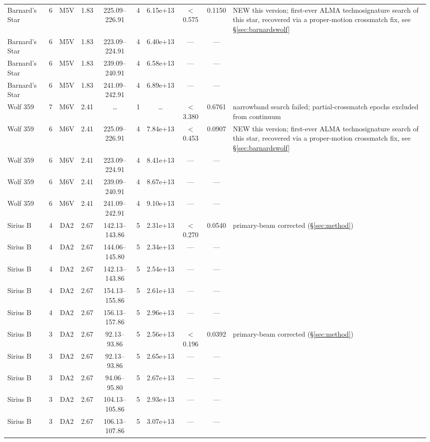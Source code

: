 \documentclass{openjournal}
\begin{document}
\begin{table}
\begin{tabularx}{\textwidth}{@{}l c c c c c c c c X@{}}
Barnard's Star & 6 & M5V & 1.83 & 225.09--226.91 & 4 & 6.15e+13 & $<$0.575 & 0.1150 & NEW this version; first-ever ALMA technosignature search of this star, recovered via a proper-motion crossmatch fix, see \S\ref{sec:barnardswolf} \\
Barnard's Star & 6 & M5V & 1.83 & 223.09--224.91 & 4 & 6.40e+13 & --- & --- &  \\
Barnard's Star & 6 & M5V & 1.83 & 239.09--240.91 & 4 & 6.58e+13 & --- & --- &  \\
Barnard's Star & 6 & M5V & 1.83 & 241.09--242.91 & 4 & 6.89e+13 & --- & --- &  \\
Wolf  359 & 7 & M6V & 2.41 & \ldots & 1 & \ldots & $<$3.380 & 0.6761 & narrowband search failed; partial-crossmatch epochs excluded from continuum \\
Wolf  359 & 6 & M6V & 2.41 & 225.09--226.91 & 4 & 7.84e+13 & $<$0.453 & 0.0907 & NEW this version; first-ever ALMA technosignature search of this star, recovered via a proper-motion crossmatch fix, see \S\ref{sec:barnardswolf} \\
Wolf  359 & 6 & M6V & 2.41 & 223.09--224.91 & 4 & 8.41e+13 & --- & --- &  \\
Wolf  359 & 6 & M6V & 2.41 & 239.09--240.91 & 4 & 8.67e+13 & --- & --- &  \\
Wolf  359 & 6 & M6V & 2.41 & 241.09--242.91 & 4 & 9.10e+13 & --- & --- &  \\
Sirius B & 4 & DA2 & 2.67 & 142.13--143.86 & 5 & 2.31e+13 & $<$0.270 & 0.0540 & primary-beam corrected (\S\ref{sec:method}) \\
Sirius B & 4 & DA2 & 2.67 & 144.06--145.80 & 5 & 2.34e+13 & --- & --- &  \\
Sirius B & 4 & DA2 & 2.67 & 142.13--143.86 & 5 & 2.54e+13 & --- & --- &  \\
Sirius B & 4 & DA2 & 2.67 & 154.13--155.86 & 5 & 2.61e+13 & --- & --- &  \\
Sirius B & 4 & DA2 & 2.67 & 156.13--157.86 & 5 & 2.96e+13 & --- & --- &  \\
Sirius B & 3 & DA2 & 2.67 & 92.13--93.86 & 5 & 2.56e+13 & $<$0.196 & 0.0392 & primary-beam corrected (\S\ref{sec:method}) \\
Sirius B & 3 & DA2 & 2.67 & 92.13--93.86 & 5 & 2.65e+13 & --- & --- &  \\
Sirius B & 3 & DA2 & 2.67 & 94.06--95.80 & 5 & 2.67e+13 & --- & --- &  \\
Sirius B & 3 & DA2 & 2.67 & 104.13--105.86 & 5 & 2.93e+13 & --- & --- &  \\
Sirius B & 3 & DA2 & 2.67 & 106.13--107.86 & 5 & 3.07e+13 & --- & --- &  \\

\end{tabularx}
\end{table}
\end{document}
